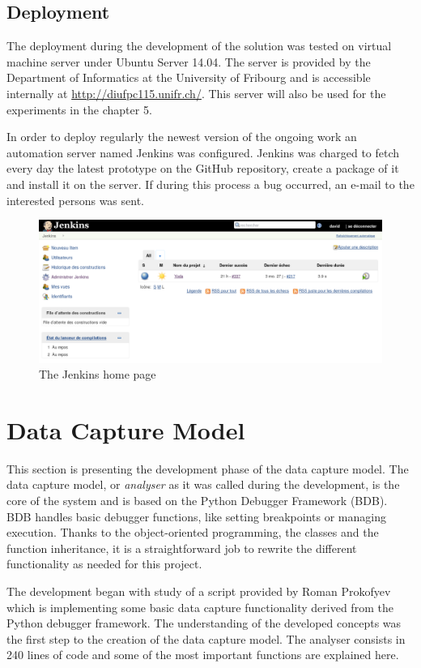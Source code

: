 \subsection{Deployment}
The deployment during the development of the solution was tested on virtual machine server under Ubuntu Server 14.04. The server is provided by the Department of Informatics at the University of Fribourg and is accessible internally at \url{http://diufpc115.unifr.ch/}. This server will also be used for the experiments in the chapter 5. 

In order to deploy regularly the newest version of the ongoing work an automation server named Jenkins was configured. Jenkins was charged to fetch every day the latest prototype on the GitHub repository, create a package of it and install it on the server. If during this process a bug occurred, an e-mail to the interested persons was sent.

\bigskip

\begin{figure}[h!]
  \centering
    \includegraphics[width=\textwidth]{figures/jenkins.png}
    \caption{The Jenkins home page}
    \label{fig:jenkins}
\end{figure}

\section{Data Capture Model}
This section is presenting the development phase of the data capture model. The data capture model, or \textit{analyser} as it was called during the development, is the core of the system and is based on the Python Debugger Framework (BDB). BDB handles basic debugger functions, like setting breakpoints or managing execution. Thanks to the object-oriented programming, the classes and the function inheritance, it is a straightforward job to rewrite the different functionality as needed for this project. 

The development began with study of a script provided by Roman Prokofyev which is implementing some basic data capture functionality derived from the Python debugger framework. The understanding of the developed concepts was the first step to the creation of the data capture model. The analyser consists in 240 lines of code and some of the most important functions are explained here.

